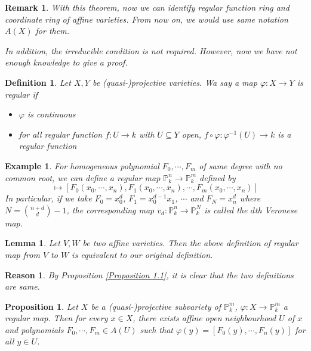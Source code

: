 \documentclass{ctexart}
\newtheorem{definition}{Definition}[section]
\newtheorem{remark}{Remark}[section]
\newtheorem{proposition}{Proposition}[section]
\newtheorem{lemma}{Lemma}[section]
\newtheorem{reason}{Reason}[section]
\newtheorem{example}{Example}[section]
\begin{document}
\begin{remark}
    With this theorem, now we can identify regular function ring and coordinate ring of affine varieties.
    From now on, we would use same notation $A(X)$ for them.
    \par
    In addition, the irreducible condition is not required. 
    However, now we have not enough knowledge to give a proof.
\end{remark}
\begin{definition}
    Let $X, Y$ be (quasi-)projective varieties.
    Wa say a map $\varphi: X \rightarrow Y$ is regular if 
    \begin{itemize}
        \item $\varphi$ is continuous
        \item for all regular function $f: U \rightarrow k$ with $U \subseteq Y$ open,
        $f \circ \varphi: \varphi^{-1}(U) \rightarrow k$ is a regular function
    \end{itemize}
\end{definition}
\begin{example}
    For homogeneous polynomial $F_{0}, \cdots, F_{m}$ of same degree with no common root,
    we can define a regular map $\mathbb{P}_{k}^{n} \longrightarrow \mathbb{P}_{k}^{m}$ defined by
    \begin{equation}
        [x_{0}, x_{1}, \cdots, x_{n}] \longmapsto [F_{0}(x_{0}, \cdots, x_{n}), F_{1}(x_{0}, \cdots, x_{n}), \cdots, F_{m}(x_{0}, \cdots, x_{n})]
    \end{equation}
    In particular, if we take $F_{0} = x_{0}^{d}$, $F_{1} = x_{0}^{d - 1}x_{1}$, $\cdots$ and $F_{N} = x_{n}^{d}$ where $N = \binom{n + d}{d} - 1$,
    the corresponding map $v_{d}: \mathbb{P}_{k}^{n} \rightarrow \mathbb{P}_{k}^{N}$ is called the $d$th Veronese map.
\end{example}
\begin{lemma}
    Let $V, W$ be two affine varieties.
    Then the above definition of regular map from $V$ to $W$ is equivalent to our original definition.
    \label{Lemma 2.3}
\end{lemma}
\begin{reason}
    By Proposition \ref{Proposition 1.1}, it is clear that the two definitions are same.
\end{reason}
\begin{proposition}
    Let $X$ be a (quasi-)projective subvariety of $\mathbb{P}_{k}^{m}$, $\varphi: X \rightarrow \mathbb{P}_{k}^{m}$ a regular map.
    Then for every $x\in X$, there exists affine open neighbourhood $U$ of $x$ and polynomials $F_{0}, \cdots, F_{m}\in A(U)$ such that $\varphi(y) = [F_{0}(y), \cdots, F_{n}(y)]$ for all $y\in U$.
    \label{Proposition 2.1}
\end{proposition}
\end{document}
